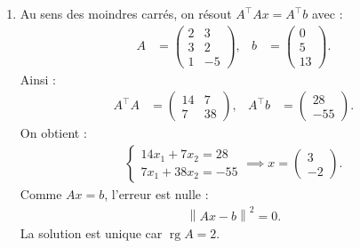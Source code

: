 \documentclass[12pt, a4paper]{article}
\newcommand{\rg}{\operatorname{rg}}
\newcommand{\norm}[1]{\left\lVert #1\right\rVert}
\begin{document}
\begin{enumerate}
    Pour la distance, soit $Q=a+bX\in\RR[X]_{\le1}$.
    On minimise :
    \begin{align*}
      \norm{X^2-Q}^2
      &=a^2+b^2+(1-a-b)^2.
    \end{align*}
    En annulant les dérivées partielles :
    \begin{align*}
      \begin{cases}
        2a+b=1\\
        a+2b=1
      \end{cases}
      \implies a=b=\frac13.
    \end{align*}
    Donc :
    \begin{align*}
      d(X^2,\RR[X]_{\le1})
      &=\sqrt{\frac19+\frac19+\frac19}\\
      &=\boxed{\frac1{\sqrt3}}.
    \end{align*}

  \item Au sens des moindres carrés, on résout
    $A^\top Ax=A^\top b$ avec :
    \begin{align*}
      A&=\begin{pmatrix}
        2&3\\3&2\\1&-5
      \end{pmatrix},
      &b&=\begin{pmatrix}0\\5\\13\end{pmatrix}.
    \end{align*}
    Ainsi :
    \begin{align*}
      A^\top A&=\begin{pmatrix}
        14&7\\7&38
      \end{pmatrix},&
      A^\top b&=\begin{pmatrix}28\\-55\end{pmatrix}.
    \end{align*}
    On obtient :
    \begin{align*}
      \begin{cases}
        14x_1+7x_2=28\\
        7x_1+38x_2=-55
      \end{cases}
      \implies
      \boxed{x=\begin{pmatrix}3\\-2\end{pmatrix}}.
    \end{align*}
    Comme $Ax=b$, l'erreur est nulle :
    \begin{align*}
      \norm{Ax-b}^2=0.
    \end{align*}
    La solution est unique car $\rg A=2$.


\end{enumerate}
\end{document}
